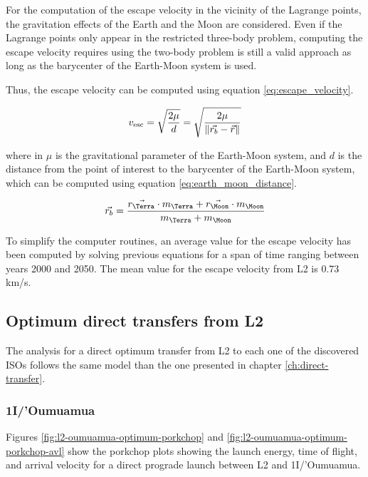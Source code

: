 For the computation of the escape velocity in the vicinity of the Lagrange
points, the gravitation effects of the Earth and the Moon are considered. Even
if the Lagrange points only appear in the restricted three-body problem,
computing the escape velocity requires using the two-body problem is still a
valid approach as long as the barycenter of the Earth-Moon system is used.

Thus, the escape velocity can be computed using equation \ref{eq:escape_velocity}.

\begin{equation}
  v_{\text{esc}} = \sqrt{\frac{2 \mu}{d}} = \sqrt{\frac{2 \mu}{\lVert\vec{r_b} - \vec{r}\rVert}}
  \label{eq:escape_velocity}
\end{equation}

where in $\mu$ is the gravitational parameter of the Earth-Moon system, and $d$
is the distance from the point of interest to the barycenter of the Earth-Moon
system, which can be computed using equation \ref{eq:earth_moon_distance}.

\begin{equation}
  \vec{r_{b}} = \frac{\vec{r_{\text{\Terra}}} \cdot m_{\text{\Terra}}
    + \vec{r_{\text{\Moon}}} \cdot m_{\text{\Moon}}}{m_{\text{\Terra}} +
    m_{\text{\Moon}}}
  \label{eq:earth_moon_distance}
\end{equation}

To simplify the computer routines, an average value for the escape velocity has
been computed by solving previous equations for a span of time ranging between
years 2000 and 2050. The mean value for the escape velocity from L2 is $0.73$
km/s.

\subsection{Optimum direct transfers from L2}

The analysis for a direct optimum transfer from L2 to each one of the discovered
ISOs follows the same model than the one presented in chapter
\ref{ch:direct-transfer}.

\subsubsection{1I/'Oumuamua}

Figures \ref{fig:l2-oumuamua-optimum-porkchop} and
\ref{fig:l2-oumuamua-optimum-porkchop-avl} show the porkchop plots showing the
launch energy, time of flight, and arrival velocity for a direct prograde launch
between L2 and 1I/'Oumuamua.

